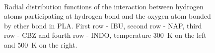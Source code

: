 \begin{figure}[H]
	\\
	\vspace{-0.2cm}
	\vspace{-0.2cm}
	\caption{Radial distribution functions of the interaction between hydrogen atoms participating at hydrogen bond and the oxygen atom bonded by ether bond in PLA. First row - IBU, second row - NAP, third row - CBZ and fourth row - INDO, temperature 300~K on the left and 500~K on the right.}
	\label{fig:ether}
\end{figure}

